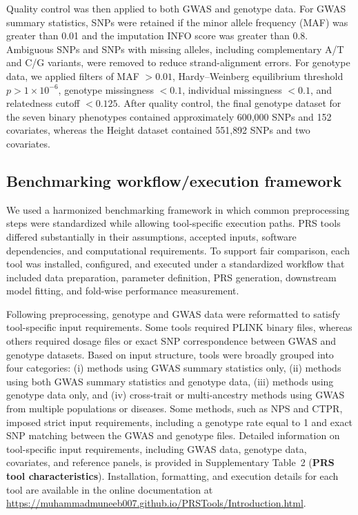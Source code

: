 \documentclass[pdflatex,sn-basic]{sn-jnl}
\begin{document}
Quality control was then applied to both GWAS and genotype data. For GWAS summary statistics, SNPs were retained if the minor allele frequency (MAF) was greater than 0.01 and the imputation INFO score was greater than 0.8. Ambiguous SNPs and SNPs with missing alleles, including complementary A/T and C/G variants, were removed to reduce strand-alignment errors. For genotype data, we applied filters of MAF $> 0.01$, Hardy--Weinberg equilibrium threshold $p > 1 \times 10^{-6}$, genotype missingness $< 0.1$, individual missingness $< 0.1$, and relatedness cutoff $< 0.125$. After quality control, the final genotype dataset for the seven binary phenotypes contained approximately 600{,}000 SNPs and 152 covariates, whereas the Height dataset contained 551{,}892 SNPs and two covariates.





\subsection*{Benchmarking workflow/execution framework}

We used a harmonized benchmarking framework in which common preprocessing steps were standardized while allowing tool-specific execution paths. PRS tools differed substantially in their assumptions, accepted inputs, software dependencies, and computational requirements. To support fair comparison, each tool was installed, configured, and executed under a standardized workflow that included data preparation, parameter definition, PRS generation, downstream model fitting, and fold-wise performance measurement.

Following preprocessing, genotype and GWAS data were reformatted to satisfy tool-specific input requirements. Some tools required PLINK binary files, whereas others required dosage files or exact SNP correspondence between GWAS and genotype datasets. Based on input structure, tools were broadly grouped into four categories: (i) methods using GWAS summary statistics only, (ii) methods using both GWAS summary statistics and genotype data, (iii) methods using genotype data only, and (iv) cross-trait or multi-ancestry methods using GWAS from multiple populations or diseases. Some methods, such as NPS and CTPR, imposed strict input requirements, including a genotype rate equal to 1 and exact SNP matching between the GWAS and genotype files. Detailed information on tool-specific input requirements, including GWAS data, genotype data, covariates, and reference panels, is provided in Supplementary Table~2 (\textbf{PRS tool characteristics}). Installation, formatting, and execution details for each tool are available in the online documentation at \url{https://muhammadmuneeb007.github.io/PRSTools/Introduction.html}.
\end{document}
